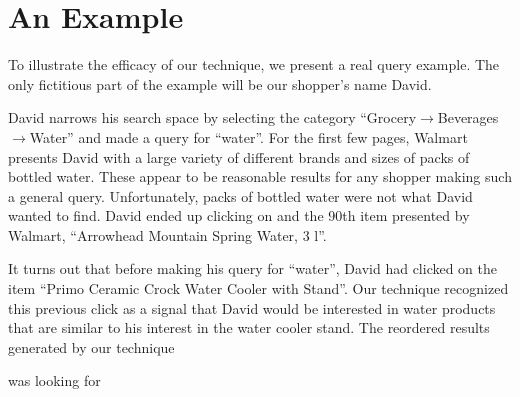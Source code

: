 \documentclass{article}
\begin{document}
\section{An Example}

To illustrate the efficacy of our technique, we present a real query example.
The only fictitious part of the example will be our shopper's name David.

David narrows his search space by selecting the category
``Grocery$\rightarrow$Beverages$\rightarrow$Water'' and made a query for
``water''. For the first few pages, Walmart presents David with a large
variety of different brands and sizes of packs of bottled water. These appear to
be reasonable results for any shopper making such a general query.
Unfortunately, packs of bottled water were not what David wanted to find. David
ended up clicking on and the 90th item presented by Walmart, ``Arrowhead
Mountain Spring Water, 3 l''. %

It turns out that before making his query for ``water'', David had clicked on
the item ``Primo Ceramic Crock Water Cooler with Stand''. %
Our technique recognized this previous click as a signal that David would be
interested in water products that are similar to his interest in the water
cooler stand. The reordered results generated by our technique 

was looking for 
\end{document}
